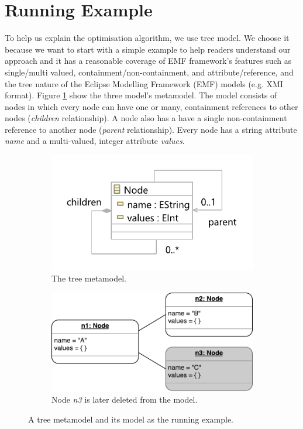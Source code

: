 \documentclass{llncs}
\begin{document}
\section{Running Example}
\label{sec:case_study}
To help us explain the optimisation algorithm, we use tree model. We choose it because we want to start with a simple example to help readers understand our approach and it has a reasonable coverage of EMF framework's features such as single/multi valued, containment/non-containment, and attribute/reference, and the tree nature of the Eclipse Modelling Framework (EMF) models (e.g. XMI format). Figure \ref{fig:node_metamodel} show the three model's metamodel. The model consists of nodes in which every node can have one or many, containment references to other nodes (\emph{children} relationship). A node also has a have a single non-containment reference to another node (\emph{parent} relationship). Every node has a string attribute \emph{name} and a multi-valued, integer attribute \emph{values}. 

\begin{figure}[ht]	
	\begin{subfigure}[t]{0.5\linewidth}
		\includegraphics[width=0.9\linewidth]{node_metamodel}
    \caption{The tree metamodel.}
    \label{fig:node_metamodel}
	\end{subfigure}
	\hfill
	\begin{subfigure}[t]{0.5\linewidth}
		\includegraphics[width=\linewidth]{initial_chart}
\caption{Node \emph{n3} is later deleted from the model.}
\label{fig:initial_model}
	\end{subfigure}
	\caption{A tree metamodel and its model as the running example.}
	\label{fig:append_speed}
\end{figure}
\end{document}
